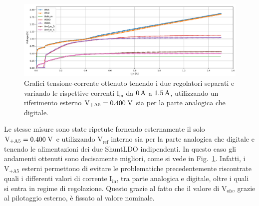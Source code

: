 \begin{figure}
\centering
\includegraphics[width=\textwidth]{Immagini/IUEViofs2}
\caption{Grafici tensione-corrente ottenuto tenendo i due regolatori separati e variando le rispettive correnti $\mathrm{I_{in}}$ da $0\rm \, A$ a $1.5\rm \, A$, utilizzando un riferimento esterno $\mathrm{V_{+A5}}=0.400\rm \; V$ sia per la parte analogica che digitale.}
\label{IUEViofs}
\end{figure}
 Le stesse misure sono state ripetute fornendo esternamente il solo $\mathrm{V_{+A5}}=0.400 \rm \; V$ e utilizzando $\mathrm{V_{ref}}$ interno sia per la parte analogica che digitale e tenendo le alimentazioni dei due ShuntLDO indipendenti. In questo caso gli andamenti ottenuti sono decisamente migliori, come si vede in Fig.~\ref{IUEViofs}. 
Infatti, i $\mathrm{V_{+A5}}$ esterni permettono di evitare le problematiche precedentemente riscontrate quali i differenti valori di corrente $\mathrm{I_{in}}$, tra parte analogica e digitale, oltre i quali si entra in regime di regolazione. Questo grazie al fatto che il valore di $\mathrm{V_{ofs}}$, grazie al pilotaggio esterno, \`e fissato al valore nominale. %
% 
%
%


